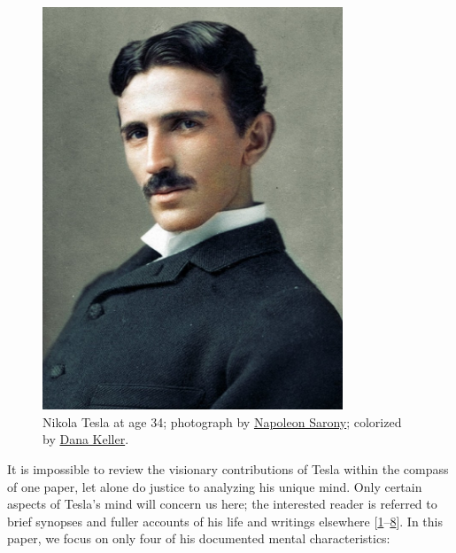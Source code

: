 \documentclass[
  a4paper,
]{article}
\begin{document}
\begin{figure}
\hypertarget{fig:tesla}{%
\centering
\includegraphics[width=0.8\textwidth,height=\textheight]{images/tesla_in_color.jpg}
\caption[Nikola Tesla at age 34; photograph by
\href{https://en.wikipedia.org/wiki/Napoleon_Sarony}{Napoleon Sarony};
colorized by \href{http://www.danarkeller.com/}{Dana Keller}.]{Nikola
Tesla at age 34; photograph by
\href{https://en.wikipedia.org/wiki/Napoleon_Sarony}{Napoleon Sarony};
colorized by \href{http://www.danarkeller.com/}{Dana
Keller}.\footnotemark{}}\label{fig:tesla}
}
\end{figure}

It is impossible to review the visionary contributions of Tesla within
the compass of one paper, let alone do justice to analyzing his unique
mind. Only certain aspects of Tesla's mind will concern us here; the
interested reader is referred to brief synopses and fuller accounts of
his life and writings elsewhere
{[}\protect\hyperlink{ref-john83}{1}--\protect\hyperlink{ref-tesla-pbs-bio}{8}{]}.
In this paper, we focus on only four of his documented mental
characteristics:
\end{document}
